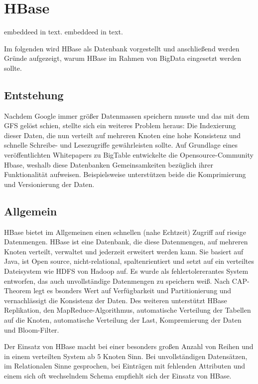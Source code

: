 \section{HBase}

\cite{Redt01} embeddeed in text.
\cite{SpaOd16} embeddeed in text.


Im folgenden wird HBase als Datenbank vorgestellt und anschließend werden Gründe aufgezeigt, warum HBase im Rahmen von BigData eingesetzt werden sollte.

\subsection{Entstehung}
Nachdem Google immer größer Datenmassen speichern musste und das mit dem GFS gelöst schien, stellte sich ein weiteres Problem heraus: Die Indexierung dieser Daten, die nun verteilt auf mehreren Knoten eine hohe Konsistenz und schnelle Schreibe- und Lesezugriffe gewährleisten sollte. Auf Grundlage eines veröffentlichten Whitepapers zu BigTable entwickelte die Opensource-Community Hbase, weshalb diese Datenbanken Gemeinsamkeiten bezüglich ihrer Funktionalität aufweisen. Beispielsweise unterstützen beide die Komprimierung und Versionierung der Daten.

\subsection{Allgemein}
HBase bietet im Allgemeinen einen schnellen (nahe Echtzeit) Zugriff auf riesige Datenmengen. HBase ist eine Datenbank, die diese Datenmengen, auf mehreren Knoten verteilt, verwaltet und jederzeit erweitert werden kann. Sie basiert auf Java, ist Open source, nicht-relational, spaltenrientiert und setzt auf ein verteiltes Dateisystem wie HDFS von Hadoop auf. Es wurde als fehlertolererantes System entworfen, das auch unvollständige Datenmengen zu speichern weiß. Nach CAP-Theorem legt es bsonders Wert auf Verfügbarkeit und Partitionierung und vernachlässigt die Konsistenz der Daten. Des weiteren unterstützt HBase Replikation, den MapReduce-Algorithmus, automatische Verteilung der Tabellen auf die Knoten, automatische Verteilung der Last, Kompremierung der Daten und Bloom-Filter. 

Der Einsatz von HBase macht bei einer besonders großen Anzahl von Reihen und in einem verteilten System ab 5 Knoten Sinn. Bei unvollständigen Datensätzen, im Relationalen Sinne gesprochen, bei Einträgen mit fehlenden Attributen und einem sich oft wechselndem Schema empfiehlt sich der Einsatz von HBase.


